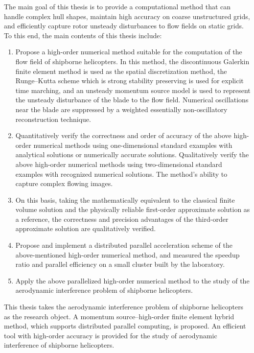 \begin{eabstract}
The main goal of this thesis is to provide a computational method that can handle complex hull shapes, maintain high accuracy on coarse unstructured grids, and efficiently capture rotor unsteady disturbances to flow fields on static grids.
To this end, the main contents of this thesis include:
\begin{enumerate}[wide]
\item Propose a high-order numerical method suitable for the computation of the flow field of shipborne helicopters. In this method, the discontinuous Galerkin finite element method is used as the spatial discretization method, the Runge--Kutta scheme which is strong stability preserving is used for explicit time marching, and an unsteady momentum source model is used to represent the unsteady disturbance of the blade to the flow field. Numerical oscillations near the blade are suppressed by a weighted essentially non-oscillatory reconstruction technique.
\item Quantitatively verify the correctness and order of accuracy of the above high-order numerical methods using one-dimensional standard examples with analytical solutions or numerically accurate solutions. Qualitatively verify the above high-order numerical methods using two-dimensional standard examples with recognized numerical solutions. The method's ability to capture complex flowing images.
\item On this basis, taking the mathematically equivalent to the classical finite volume solution and the physically reliable first-order approximate solution as a reference, the correctness and precision advantages of the third-order approximate solution are qualitatively verified.
\item Propose and implement a distributed parallel acceleration scheme of the above-mentioned high-order numerical method, and measured the speedup ratio and parallel efficiency on a small cluster built by the laboratory.
\item Apply the above parallelized high-order numerical method to the study of the aerodynamic interference problem of shipborne helicopters.
\end{enumerate}

This thesis takes the aerodynamic interference problem of shipborne helicopters as the research object.
A momentum source--high-order finite element hybrid method, which supports distributed parallel computing, is proposed.
An efficient tool with high-order accuracy is provided for the study of aerodynamic interference of shipborne helicopters.
\end{eabstract}